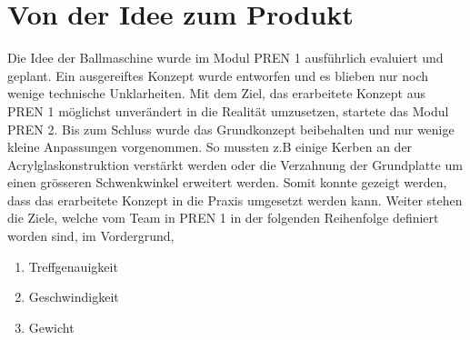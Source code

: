 \section{Von der Idee zum Produkt}
Die Idee der Ballmaschine wurde im Modul PREN 1 ausführlich evaluiert und geplant. 
Ein ausgereiftes Konzept wurde entworfen und es blieben nur noch wenige 
technische Unklarheiten. Mit dem Ziel, das erarbeitete Konzept aus PREN 1 möglichst 
unverändert in die Realität umzusetzen, startete das Modul PREN 2.
Bis zum Schluss wurde das Grundkonzept beibehalten und nur wenige kleine Anpassungen 
vorgenommen. So mussten z.B einige Kerben an der Acrylglaskonstruktion verstärkt werden
oder die Verzahnung der Grundplatte um einen grösseren Schwenkwinkel erweitert werden. 
Somit konnte gezeigt werden, dass das erarbeitete Konzept in die Praxis umgesetzt 
werden kann. Weiter stehen die Ziele, welche vom Team in PREN 1 in der folgenden Reihenfolge definiert 
worden sind, im Vordergrund,
\begin{enumerate}
	\item Treffgenauigkeit
	\item Geschwindigkeit
	\item Gewicht
\end{enumerate}